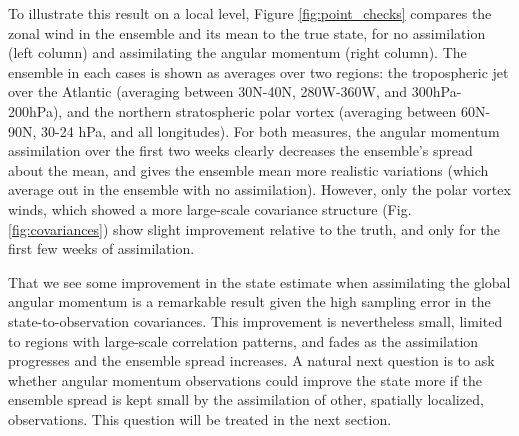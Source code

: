 To illustrate this result on a local level, Figure \ref{fig:point_checks} compares the zonal wind in the ensemble and its mean to the true state, for no assimilation (left column) and assimilating the angular momentum (right column). 
The ensemble in each cases is shown as averages over two regions: the tropospheric jet over the Atlantic (averaging between 30N-40N, 280W-360W, and 300hPa-200hPa), and the northern stratospheric polar vortex (averaging between 60N-90N, 30-24 hPa, and all longitudes).
For both measures, the angular momentum assimilation over the first two weeks clearly decreases the ensemble's spread about the mean, and gives the ensemble mean more realistic variations (which average out in the ensemble with no assimilation). 
However, only the polar vortex winds, which showed a more large-scale covariance structure (Fig. \ref{fig:covariances}) show slight improvement relative to the truth, and only for the first few weeks of assimilation. 

That we see some improvement in the state estimate when assimilating the global angular momentum is a remarkable result given the high sampling error in the state-to-observation covariances. 
This improvement is nevertheless small, limited to regions with large-scale correlation patterns, and fades as the assimilation progresses and the ensemble spread increases.
A natural next question is to ask whether angular momentum observations could improve the state more if the ensemble spread is kept small by the assimilation of other, spatially localized, observations. 
This question will be treated in the next section.  
